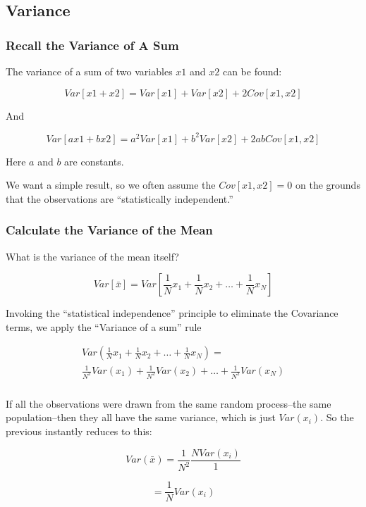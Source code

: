 \documentclass[10pt,english]{beamer}
\begin{document}
\subsection{Variance}

\begin{frame}
  \frametitle{Recall the Variance of A Sum}

The variance of a sum of two variables $x1$ and $x2$ can be found:

\begin{equation}
Var[x1+x2] = Var[x1]+ Var[x2] + 2Cov[x1,x2]\label{eq:VarianceX1X2}\end{equation}

And

\begin{equation}
Var[ax1+bx2]=a^{2} Var[x1]+b^{2} Var[x2] + 2abCov[x1,x2]\label{eq:VarianceOfSum}\end{equation}

Here $a$ and $b$ are constants.

We want a simple result, so we often assume the $Cov[x1,x2]=0$
on the grounds that the observations are {}``statistically independent.''

\end{frame}

\begin{frame}
  \frametitle{Calculate the Variance of the Mean}

What is the variance of the mean itself?

\begin{equation}
Var[\bar{x}]=Var[\frac{1}{N}x_{1}+\frac{1}{N}x_{2}+\ldots+\frac{1}{N}x_{N}]\label{eq:VarOfMean1}\end{equation}


Invoking the ``statistical independence'' principle to eliminate
the Covariance terms, we apply the ``Variance of a sum'' rule

\begin{eqnarray}
Var(\frac{1}{N}x_{1}+\frac{1}{N}x_{2}+\ldots+\frac{1}{N}x_{N})= \\
  \frac{1}{N^{2}}Var(x_{1})+\frac{1}{N^{2}}Var(x_{2})+\ldots+\frac{1}{N^{2}}Var(x_{N})\label{eq:VarOfMean2}\end{eqnarray}

\end{frame}

\begin{frame}
  \frametitle{}

If all the observations were drawn from the same random process--the
same population--then they all have the same variance, which is just
$Var(x_{i})$. So the previous instantly reduces to this:

\begin{equation}
Var(\bar{x})=\frac{1}{N^{2}}\frac{NVar(x_{i})}{1}\label{eq:-8}\end{equation}


\begin{equation}
=\frac{1}{N}Var(x_{i})\label{eq:varN2}
\end{equation}

\end{frame}

%
\end{document}
